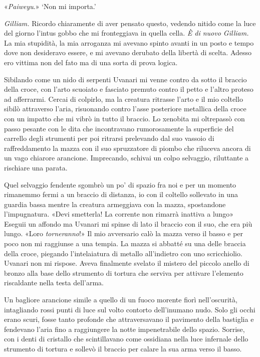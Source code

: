 «\emph{Paiweyu}.» `Non mi importa.'

\emph{Gilliam.} Ricordo chiaramente di aver pensato questo, vedendo
nitido come la luce del giorno l'intus gobbo che mi fronteggiava in
quella cella. \emph{È di nuovo Gilliam.} La mia stupidità, la mia
arroganza mi avevano spinto avanti in un posto e tempo dove non
desideravo essere, e mi avevano derubato della libertà di scelta. Adesso
ero vittima non del fato ma di una sorta di prova logica.

Sibilando come un nido di serpenti Uvanari mi venne contro da sotto il
braccio della croce, con l'arto scuoiato e fasciato premuto contro il
petto e l'altro proteso ad afferrarmi. Cercai di colpirlo, ma la
creatura ritrasse l'arto e il mio coltello sibilò attraverso l'aria,
risuonando contro l'asse posteriore metallica della croce con un impatto
che mi vibrò in tutto il braccio. Lo xenobita mi oltrepassò con passo
pesante con le dita che incontravano rumorosamente la superficie del
carrello degli strumenti per poi ritrarsi prelevando dal suo vassoio di
raffreddamento la mazza con il suo spruzzatore di piombo che riluceva
ancora di un vago chiarore arancione. Imprecando, schivai un colpo
selvaggio, riluttante a rischiare una parata.

Quel selvaggio fendente sgombrò un po' di spazio fra noi e per un
momento rimanemmo fermi a un braccio di distanza, io con il coltello
sollevato in una guardia bassa mentre la creatura armeggiava con la
mazza, spostandone l'impugnatura. «Devi smetterla! La corrente non
rimarrà inattiva a lungo» Eseguii un affondo ma Uvanari mi spinse di
lato il braccio con il suo, che era più lungo. «Loro \emph{torneranno}!»
Il mio avversario calò la mazza verso il basso e per poco non mi
raggiunse a una tempia. La mazza si abbatté su una delle braccia della
croce, piegando l'intelaiatura di metallo all'indietro con uno
scricchiolio. Uvanari non mi rispose. Aveva finalmente svelato il
mistero del piccolo anello di bronzo alla base dello strumento di
tortura che serviva per attivare l'elemento riscaldante nella testa
dell'arma.

Un bagliore arancione simile a quello di un fuoco morente fiorì
nell'oscurità, intagliando rossi punti di luce sul volto contorto
dell'inumano nudo. Solo gli occhi erano scuri, fosse tanto profonde che
attraversavano il pavimento della bastiglia e fendevano l'aria fino a
raggiungere la notte impenetrabile dello spazio. Sorrise, con i denti di
cristallo che scintillavano come ossidiana nella luce {infernale} dello
strumento di tortura e sollevò il braccio per calare la sua arma verso
il basso.


